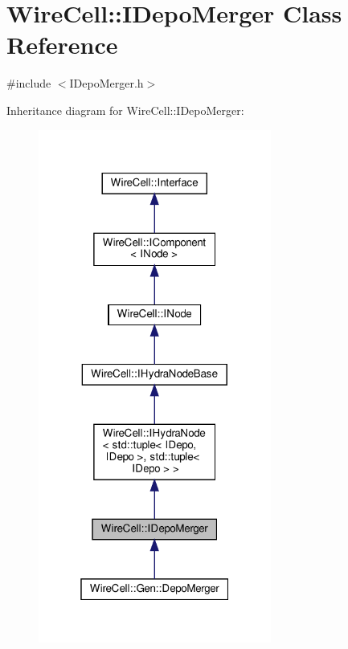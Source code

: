 \hypertarget{class_wire_cell_1_1_i_depo_merger}{}\section{Wire\+Cell\+:\+:I\+Depo\+Merger Class Reference}
\label{class_wire_cell_1_1_i_depo_merger}


{\ttfamily \#include $<$I\+Depo\+Merger.\+h$>$}



Inheritance diagram for Wire\+Cell\+:\+:I\+Depo\+Merger\+:
\nopagebreak
\begin{figure}[H]
\begin{center}
\leavevmode
\includegraphics[width=217pt]{class_wire_cell_1_1_i_depo_merger__inherit__graph}
\end{center}
\end{figure}


